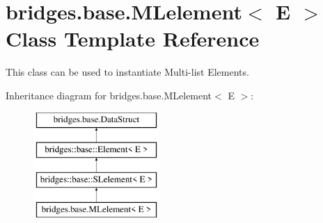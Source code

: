 \hypertarget{classbridges_1_1base_1_1_m_lelement}{}\section{bridges.\+base.\+M\+Lelement$<$ E $>$ Class Template Reference}
\label{classbridges_1_1base_1_1_m_lelement}


This class can be used to instantiate Multi-\/list Elements.  


Inheritance diagram for bridges.\+base.\+M\+Lelement$<$ E $>$\+:\begin{figure}[H]
\begin{center}
\leavevmode
\includegraphics[height=4.000000cm]{classbridges_1_1base_1_1_m_lelement}
\end{center}
\end{figure}
